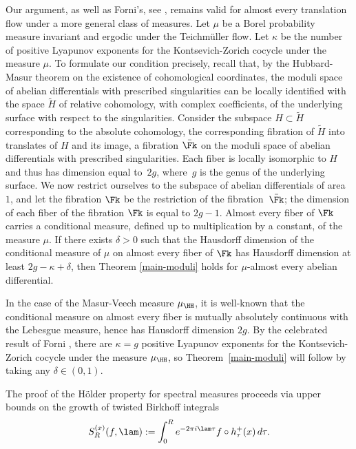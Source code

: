 \begin{remark} \label{remark-main}
Our argument, as well as Forni's, see \cite[Rem.\,1.9]{Forni2}, remains valid for almost every translation flow under a more general class of measures. Let $\mu$ be a Borel probability measure invariant and ergodic under the Teichmüller flow.
Let $\kappa$ be the number of positive Lyapunov exponents for the Kontsevich-Zorich cocycle under the measure $\mu$.
To formulate our condition precisely, recall that, by the Hubbard-Masur theorem on the existence of cohomological coordinates, the moduli space of abelian differentials with prescribed singularities can be locally identified with the space
${\widetilde H}$ of relative cohomology, with complex coefficients, of the underlying surface with respect to the singularities. Consider the subspace $H\subset {\widetilde H}$ corresponding to the absolute cohomology, the corresponding fibration of ${\widetilde H}$ into translates of $H$ and its image, a fibration $\bar{\Fk}$ on the moduli space of abelian differentials with prescribed singularities. Each fiber is locally isomorphic to $H$ and thus has dimension equal to~$2g$, where~$g$ is the genus of the underlying surface. We now restrict ourselves to the subspace of abelian differentials of area $1$, and let the fibration $\Fk$ be the restriction of the fibration~$\bar{\Fk}$; the dimension of each fiber of the fibration $\Fk$ is equal to $2g-1$. Almost every fiber of $\Fk$ carries a conditional measure, defined up to multiplication by a constant, of the measure $\mu$. If there exists
$\delta>0$ such that the Hausdorff dimension of the conditional measure of $\mu$ on almost every fiber of $\Fk$ has Hausdorff dimension at least $2g-\kappa+\delta$, then Theorem \ref{main-moduli} holds for $\mu$-almost every abelian differential.

In the case of the Masur-Veech measure $\mu_\HH$, it is well-known that the conditional measure on almost every fiber is mutually absolutely continuous with the Lebesgue measure, hence has Hausdorff dimension $2g$. By the celebrated result of Forni \cite{Forni}, there are $\kappa=g$ positive Lyapunov exponents for the Kontsevich-Zorich cocycle under the measure $\mu_\HH$, so
Theorem~\ref{main-moduli} will follow by taking any $\delta\in (0,1)$.
\end{remark}

The proof of the Hölder property for spectral measures proceeds via upper bounds on the growth of twisted Birkhoff integrals
\[
S_R^{(x)}(f,\lam) := \int_0^R e^{-2\pi i \lam \tau} f\circ h^+_\tau(x)\,d\tau.
\]


